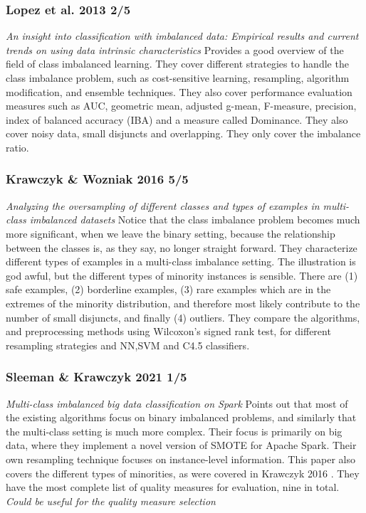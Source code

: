 \subsubsection*{Lopez et al. 2013 2/5}
\emph{An insight into classification with imbalanced data: Empirical results and current trends on using data intrinsic characteristics} \cite{lopez2013insight} Provides a good overview of the field of class imbalanced learning. They cover different strategies to handle the class imbalance problem, such as cost-sensitive learning, resampling, algorithm modification, and ensemble techniques. They also cover performance evaluation measures such as AUC, geometric mean, adjusted g-mean, F-measure, precision, index of balanced accuracy (IBA) and a measure called Dominance. They also cover noisy data, small disjuncts and overlapping. They only cover the imbalance ratio.

\subsubsection*{Krawczyk \& Wozniak 2016 5/5}
\emph{Analyzing the oversampling of different classes and types of examples in multi-class imbalanced datasets} \cite{Saez:2016} Notice that the class imbalance problem becomes much more significant, when we leave the binary setting, because the relationship between the classes is, as they say, no longer straight forward. They characterize different types of examples in a multi-class imbalance setting. The illustration is god awful, but the different types of minority instances is sensible. There are (1) safe examples, (2) borderline examples, (3) rare examples which are in the extremes of the minority distribution, and therefore most likely contribute to the number of small disjuncts, and finally (4) outliers. They compare the algorithms, and preprocessing methods using Wilcoxon's signed rank test, for different resampling strategies and NN,SVM and C4.5 classifiers.      

\subsubsection*{Sleeman \& Krawczyk 2021 1/5}
\emph{Multi-class imbalanced big data classification on Spark} \cite{Sleeman:2021} Points out that most of the existing algorithms focus on binary imbalanced problems, and similarly that the multi-class setting is much more complex. Their focus is primarily on big data, where they implement a novel version of SMOTE for Apache Spark. Their own resampling technique focuses on instance-level information. This paper also covers the different types of minorities, as were covered in Krawczyk 2016 \cite{Saez:2016}. They have the most complete list of quality measures for evaluation, nine in total. \emph{Could be useful for the quality measure selection}
 
